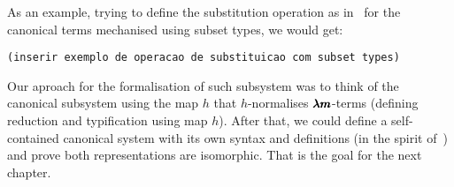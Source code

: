 As an example, trying to define the substitution operation as in~\cite[Chapter~3.1]{JCES2002} for the canonical terms mechanised using subset types, we would get:
\begin{lstlisting}[language=Coq]
  (inserir exemplo de operacao de substituicao com subset types)
\end{lstlisting}

Our aproach for the formalisation of such subsystem was to think of the canonical subsystem using the map $h$ that $h$-normalises $\pmb{\lambda m}$-terms (defining reduction and typification using map $h$).
After that, we could define a self-contained canonical system with its own syntax and definitions (in the spirit of~\cite[Chapter~3.1]{JCES2002}) and prove both representations are isomorphic.
That is the goal for the next chapter.

